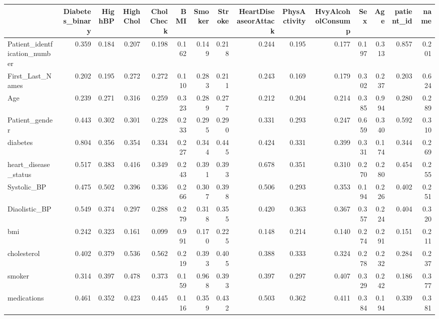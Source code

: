 \begin{tabular}{lrrrrrrrrrrrrrr}
\toprule
 & Diabetes_binary & HighBP & HighChol & CholCheck & BMI & Smoker & Stroke & HeartDiseaseorAttack & PhysActivity & HvyAlcoholConsump & Sex & Age & patient_id & name \\
\midrule
Patient_identfication_number & 0.359 & 0.184 & 0.207 & 0.198 & 0.162 & 0.149 & 0.218 & 0.244 & 0.195 & 0.177 & 0.197 & 0.313 & 0.857 & 0.201 \\
First_Last_Names & 0.202 & 0.195 & 0.272 & 0.272 & 0.110 & 0.283 & 0.211 & 0.243 & 0.169 & 0.179 & 0.302 & 0.237 & 0.203 & 0.624 \\
Age & 0.239 & 0.271 & 0.316 & 0.259 & 0.323 & 0.289 & 0.277 & 0.212 & 0.204 & 0.214 & 0.385 & 0.994 & 0.280 & 0.289 \\
Patient_gender & 0.443 & 0.302 & 0.301 & 0.228 & 0.233 & 0.295 & 0.290 & 0.331 & 0.293 & 0.247 & 0.659 & 0.340 & 0.592 & 0.310 \\
diabetes & 0.804 & 0.356 & 0.354 & 0.334 & 0.227 & 0.344 & 0.445 & 0.424 & 0.331 & 0.399 & 0.331 & 0.174 & 0.344 & 0.269 \\
heart_disease_status & 0.517 & 0.383 & 0.416 & 0.349 & 0.243 & 0.391 & 0.393 & 0.678 & 0.351 & 0.310 & 0.270 & 0.280 & 0.454 & 0.255 \\
Systolic_BP & 0.475 & 0.502 & 0.396 & 0.336 & 0.266 & 0.307 & 0.398 & 0.506 & 0.293 & 0.353 & 0.194 & 0.226 & 0.402 & 0.251 \\
Diaolistic_BP & 0.549 & 0.374 & 0.297 & 0.288 & 0.279 & 0.318 & 0.355 & 0.420 & 0.363 & 0.367 & 0.357 & 0.224 & 0.404 & 0.320 \\
bmi & 0.242 & 0.323 & 0.161 & 0.099 & 0.991 & 0.170 & 0.225 & 0.148 & 0.214 & 0.140 & 0.274 & 0.291 & 0.151 & 0.211 \\
cholesterol & 0.402 & 0.379 & 0.536 & 0.562 & 0.219 & 0.393 & 0.405 & 0.388 & 0.333 & 0.324 & 0.278 & 0.232 & 0.284 & 0.237 \\
smoker & 0.314 & 0.397 & 0.478 & 0.373 & 0.159 & 0.968 & 0.393 & 0.397 & 0.297 & 0.407 & 0.329 & 0.242 & 0.186 & 0.377 \\
medications & 0.461 & 0.352 & 0.423 & 0.445 & 0.116 & 0.359 & 0.432 & 0.503 & 0.362 & 0.411 & 0.384 & 0.194 & 0.339 & 0.381 \\
\bottomrule
\end{tabular}
